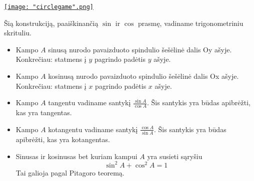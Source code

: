 \documentclass[a4paper]{article}
\begin{document}
\href{run: circlegame.ggb}{\texttt{[image: "circlegame".png]}}

Šią konstrukciją, paaiškinančią $\sin$ ir $\cos$ prasmę, vadiname trigonometriniu skrituliu.

\begin{mdframed}[backgroundcolor=yellow!50!white]
\begin{itemize}
\item Kampo $A$ sinusą  nurodo pavaizduoto spindulio šešėlinė dalis Oy ašyje. Konkrečiau: statmens į $y$ pagrindo padėtis $y$ ašyje.
\item Kampo $A$ kosinusą  nurodo pavaizduoto spindulio šešėlinė dalis Ox ašyje. Konkrečiau: statmens į $x$ pagrindo padėtis $x$ ašyje.
\item Kampo $A$ tangentu  vadiname santykį $\frac{\sin{A}}{\cos{A}}$. Šis santykis yra būdas apibrėžti, kas yra tangentas.
\item Kampo $A$ kotangentu  vadiname santykį $\frac{\cos{A}}{\sin{A}}$. Šis santykis yra būdas apibrėžti, kas yra kotangentas.
\item Sinusas ir kosinusas bet kuriam kampui $A$ yra susieti sąryšiu $$\sin^2{A}+\cos^2{A}=1$$ Tai galioja pagal Pitagoro teoremą.
\end{itemize}
\end{mdframed}
\end{document}
